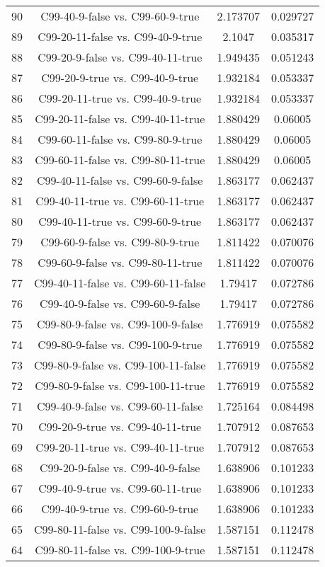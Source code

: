 \documentclass[a4paper,10pt]{article}
\begin{document}
\begin{landscape}
\begin{table}[!htp]
\begin{tabular}{cccc}
90&C99-40-9-false vs. C99-60-9-true&2.173707&0.029727\\
89&C99-20-11-false vs. C99-40-9-true&2.1047&0.035317\\
88&C99-20-9-false vs. C99-40-11-true&1.949435&0.051243\\
87&C99-20-9-true vs. C99-40-9-true&1.932184&0.053337\\
86&C99-20-11-true vs. C99-40-9-true&1.932184&0.053337\\
85&C99-20-11-false vs. C99-40-11-true&1.880429&0.06005\\
84&C99-60-11-false vs. C99-80-9-true&1.880429&0.06005\\
83&C99-60-11-false vs. C99-80-11-true&1.880429&0.06005\\
82&C99-40-11-false vs. C99-60-9-false&1.863177&0.062437\\
81&C99-40-11-true vs. C99-60-11-true&1.863177&0.062437\\
80&C99-40-11-true vs. C99-60-9-true&1.863177&0.062437\\
79&C99-60-9-false vs. C99-80-9-true&1.811422&0.070076\\
78&C99-60-9-false vs. C99-80-11-true&1.811422&0.070076\\
77&C99-40-11-false vs. C99-60-11-false&1.79417&0.072786\\
76&C99-40-9-false vs. C99-60-9-false&1.79417&0.072786\\
75&C99-80-9-false vs. C99-100-9-false&1.776919&0.075582\\
74&C99-80-9-false vs. C99-100-9-true&1.776919&0.075582\\
73&C99-80-9-false vs. C99-100-11-false&1.776919&0.075582\\
72&C99-80-9-false vs. C99-100-11-true&1.776919&0.075582\\
71&C99-40-9-false vs. C99-60-11-false&1.725164&0.084498\\
70&C99-20-9-true vs. C99-40-11-true&1.707912&0.087653\\
69&C99-20-11-true vs. C99-40-11-true&1.707912&0.087653\\
68&C99-20-9-false vs. C99-40-9-false&1.638906&0.101233\\
67&C99-40-9-true vs. C99-60-11-true&1.638906&0.101233\\
66&C99-40-9-true vs. C99-60-9-true&1.638906&0.101233\\
65&C99-80-11-false vs. C99-100-9-false&1.587151&0.112478\\
64&C99-80-11-false vs. C99-100-9-true&1.587151&0.112478\\

\end{tabular}
\end{table}
\end{landscape}
\end{document}
